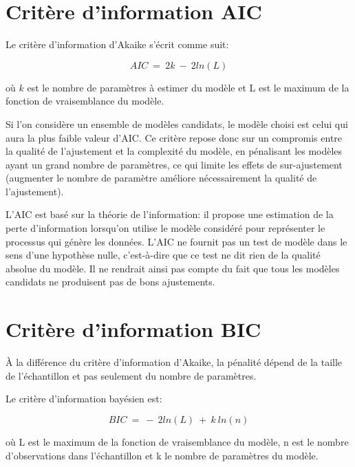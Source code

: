 \documentclass[12pt,fleqn]{book} %
\begin{document}
\newpage

\section{Critère d'information AIC}

\vspace{1em}

Le critère d'information d'Akaike s'écrit comme suit:

\[
AIC\:=\:2k\:-\:2ln(L)
\]

où $k$ est le nombre de paramètres à estimer du modèle et L est le maximum de la fonction de vraisemblance du modèle.

\vspace{1em}

Si l'on considère un ensemble de modèles candidats, le modèle choisi est celui qui aura la plus faible valeur d'AIC. Ce critère repose donc sur un compromis entre la qualité de l'ajustement et la complexité du modèle, en pénalisant les modèles ayant un grand nombre de paramètres, ce qui limite les effets de sur-ajustement (augmenter le nombre de paramètre améliore nécessairement la qualité de l'ajustement).

L'AIC est basé sur la théorie de l'information: il propose une estimation de la perte d'information lorsqu'on utilise le modèle considéré pour représenter le processus qui génère les données. L'AIC ne fournit pas un test de modèle dans le sens d'une hypothèse nulle, c'est-à-dire que ce test ne dit rien de la qualité absolue du modèle. Il ne rendrait ainsi pas compte du fait que tous les modèles candidats ne produisent pas de bons ajustements.

\vspace{1em}

\section{Critère d'information BIC}

\vspace{1em}

À la différence du critère d'information d'Akaike, la pénalité dépend de la taille de l'échantillon et pas seulement du nombre de paramètres.

\vspace{1em}

Le critère d'information bayésien est:

\[
BIC\:=\:-\:2ln(L)\:+\:k\:ln(n)
\]

où L est le maximum de la fonction de vraisemblance du modèle, n est le nombre d'observations dans l'échantillon et k le nombre de paramètres du modèle.
\end{document}
